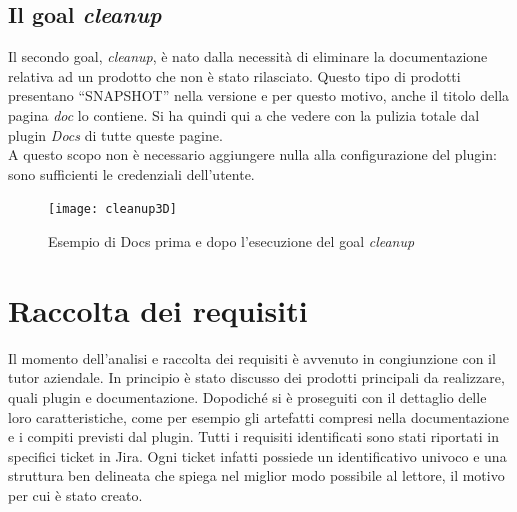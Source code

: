 \subsection{Il goal \emph{cleanup}}
Il secondo goal, \emph{cleanup}, è nato dalla necessità di eliminare la documentazione relativa ad un prodotto che non è stato rilasciato.
Questo tipo di prodotti presentano ``SNAPSHOT'' nella versione e per questo motivo, anche il titolo della pagina \emph{doc} lo contiene.
Si ha quindi qui a che vedere con la pulizia totale dal plugin \emph{Docs} di tutte queste pagine. \\
A questo scopo non è necessario aggiungere nulla alla configurazione del plugin: sono sufficienti le credenziali dell'utente. 

\begin{figure}[H]
	\centering
	\texttt{[image: cleanup3D]}\\
	\caption{Esempio di Docs prima e dopo l'esecuzione del goal \emph{cleanup}}
	\label{cleanupBeforeAfter}
\end{figure}





\section{Raccolta dei requisiti}
Il momento dell'analisi e raccolta dei requisiti è avvenuto in congiunzione con il tutor aziendale.
In principio è stato discusso dei prodotti principali da realizzare, quali plugin e documentazione. 
Dopodiché si è proseguiti con il dettaglio delle loro caratteristiche, come per esempio gli artefatti compresi nella documentazione e i compiti previsti dal plugin.
Tutti i requisiti identificati sono stati riportati in specifici ticket in Jira.
Ogni ticket infatti possiede un identificativo univoco e una struttura ben delineata che spiega nel miglior modo possibile al lettore, il motivo per cui è stato creato.


\clearpage


